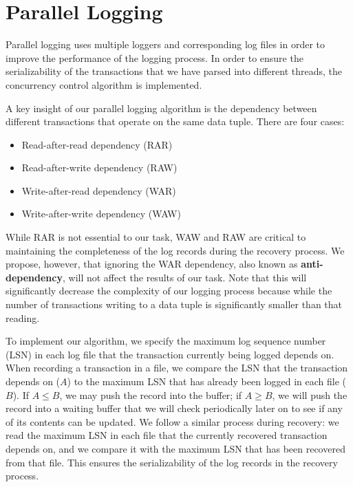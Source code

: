 \section{Parallel Logging}

Parallel logging uses multiple loggers and corresponding log files in order to improve the performance of the logging process. In order to ensure the serializability of the transactions that we have parsed into different threads, the concurrency control algorithm is implemented. \par
A key insight of our parallel logging algorithm is the dependency between different transactions that operate on the same data tuple. There are four cases:
\begin{itemize}
\item Read-after-read dependency (RAR)
\item Read-after-write dependency (RAW)
\item Write-after-read dependency (WAR)
\item Write-after-write dependency (WAW)
\end{itemize}
While RAR is not essential to our task, WAW and RAW are critical to maintaining the completeness of the log records during the recovery process. We propose, however, that ignoring the WAR dependency, also known as  \textbf{anti-dependency}, will not affect the results of our task. %
Note that this will significantly decrease the complexity of our logging process because while the number of transactions writing to a data tuple is significantly smaller than that reading. \par
To implement our algorithm, we specify the maximum log sequence number (LSN) in each log file that the transaction currently being logged depends on. When recording a transaction in a file, we compare the LSN that the transaction depends on ($A$) to the maximum LSN that has already been logged in each file ($B$). If $A\leq B$, we may push the record into the buffer; if $A\geq B$, we will push the record into a waiting buffer that we will check periodically later on to see if any of its contents can be updated. We follow a similar process during recovery: we read the maximum LSN in each file that the currently recovered transaction depends on, and we compare it with the maximum LSN that has been recovered from that file. This ensures the serializability of the log records in the recovery process. \par